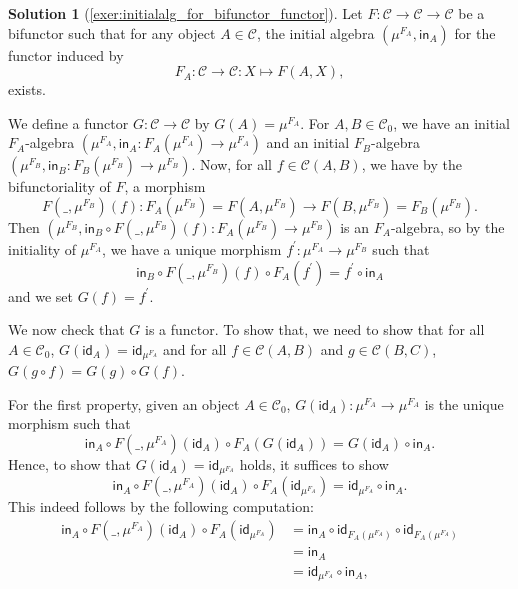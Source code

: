 \documentclass[a4paper,11pt, oneside,titlepage=false]{scrbook}
\theoremstyle{plain}
\theoremstyle{definition}
\newtheorem{solution}[thm]{Solution}
\newcommand{\cfont}[1]{\ensuremath{\mathsf{#1}}}
\newcommand{\Cat}[1]{\mathcal{#1}}
\newcommand{\CC}{\Cat{C}}
\newcommand{\Ob}[1]{{#1}_0}
\newcommand{\Id}[1][]{\cfont{id}_{#1}}
\newcommand{\Initalg}[1]{\ensuremath{\mu^{#1}}}
\newcommand{\In}{\ensuremath{\mathsf{in}}}
\begin{document}
\begin{solution}[\cref{exer:initialalg_for_bifunctor_functor}]\label{sol:initialalg_for_bifunctor_functor}
	Let $F:\CC\to\CC\to\CC$ be a bifunctor such that for any object $A\in\CC$, the initial algebra $ (\Initalg{F_A}, \In_A) $ for the functor induced by
	\[ F_A : \CC\to\CC : X \mapsto F(A,X), \]
	exists.

	We define a functor $ G: \CC \to \CC $ by $ G(A) = \Initalg{F_A} $. For $ A, B \in \Ob\CC $, we have an initial $ F_A $-algebra $ (\Initalg{F_A}, \In_A: F_A(\Initalg{F_A}) \to \Initalg{F_A}) $ and an initial $ F_B $-algebra $ (\Initalg{F_B}, \In_B: F_B(\Initalg{F_B}) \to \Initalg{F_B}) $. Now, for all $ f \in \CC(A, B) $, we have by the bifunctoriality of $ F $, a morphism
	\[ F(\_, \Initalg{F_B})(f): F_A(\Initalg{F_B}) = F(A, \Initalg{F_B}) \to F(B, \Initalg{F_B}) = F_B(\Initalg{F_B}). \]
	Then $ (\Initalg{F_B}, \In_B \circ F(\_, \Initalg{F_B})(f): F_A(\Initalg{F_B}) \to \Initalg{F_B}) $ is an $ F_A $-algebra, so by the initiality of $ \Initalg{F_A} $, we have a unique morphism $ f^\prime: \Initalg{F_A} \to \Initalg{F_B} $ such that
	\[ \In_B \circ F(\_, \Initalg{F_B})(f) \circ F_A(f^\prime) = f^\prime \circ \In_A \]
	and we set $ G(f) = f^\prime $.

	We now check that $ G $ is a functor. To show that, we need to show that for all $ A \in \Ob \CC $, $ G(\Id[A]) = \Id[\Initalg{F_A}] $ and for all $ f \in \CC(A, B) $ and $ g \in \CC(B, C) $, $ G(g \circ f) = G(g) \circ G(f) $.

	For the first property, given an object $ A \in \Ob \CC $, $ G(\Id[A]): \Initalg{F_A} \to \Initalg{F_A} $ is the unique morphism such that
	\[ \In_A \circ F(\_, \Initalg{F_A})(\Id[A]) \circ F_A(G(\Id[A])) = G(\Id[A]) \circ \In_A. \]
	Hence, to show that $ G(\Id[A]) = \Id[\Initalg{F_A}] $ holds, it suffices to show
	\[ \In_A \circ F(\_, \Initalg{F_A})(\Id[A]) \circ F_A(\Id[\Initalg{F_A}]) = \Id[\Initalg{F_A}] \circ \In_A. \]
	This indeed follows by the following computation:
	\begin{align*}
		\In_A \circ F(\_, \Initalg{F_A})(\Id[A]) \circ F_A(\Id[\Initalg{F_A}]) &= \In_A \circ \Id[F_A(\Initalg{F_A})] \circ \Id[F_A(\Initalg{F_A})]\\
		&= \In_A\\
		&= \Id[\Initalg{F_A}] \circ \In_A,
	\end{align*}


\end{solution}
\end{document}
